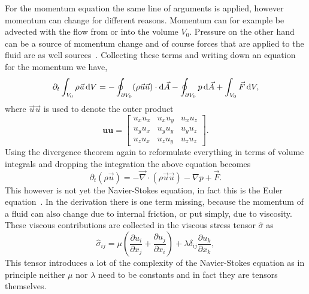 For the momentum equation the same line of arguments is applied, however momentum can change for different reasons.
Momentum can for example be advected with the flow from or into the volume $V_0$.
Pressure on the other hand can be a source of momentum change and of course forces that are applied to the fluid are as well sources~\cite{krugerLatticeBoltzmannMethod2017}.
Collecting these terms and writing down an equation for the momentum we have,
\begin{equation}\label{eq:navier_stokes_1}
    \partial_t \int_{V_0}\rho\vec{u}\mathop{}\!\mathrm{d} V = -\oint_{\partial V_0}(\rho\vec{u}\vec{u})\cdot\mathop{}\!\mathrm{d}\vec{A} - \oint_{\partial V_0} p\mathop{}\!\mathrm{d}\vec{A} + \int_{V_0} \vec{F}\mathop{}\!\mathrm{d} V, 
\end{equation}
where $\vec{u}\vec{u}$ is used to denote the outer product
\begin{equation}
    \mathbf{u}\mathbf{u} = \begin{bmatrix}
    u_x u_x & u_x u_y & u_x u_z \\
    u_y u_x & u_y u_y & u_y u_z \\
    u_z u_x & u_z u_y & u_z u_z
    \end{bmatrix} .
\end{equation}
Using the divergence theorem again to reformulate everything in terms of volume integrals and dropping the integration the above equation becomes
\begin{equation}\label{eq:navier_stokes_2}
    \partial_t(\rho\vec{u}) = -\vec{\nabla}\cdot(\rho\vec{u}\vec{u}) - \nabla p + \vec{F}.
\end{equation}
This however is not yet the Navier-Stokes equation, in fact this is the Euler equation~\cite{batchelorIntroductionFluidDynamics1967}.
In the derivation there is one term missing, because the momentum of a fluid can also change due to internal friction, or put simply, due to viscosity.
These viscous contributions are collected in the viscous stress tensor $\hat{\sigma}$ as
\begin{equation}\label{eq:stress_tens}
    \hat{\sigma}_{ij} = \mu\left(\frac{\partial u_i}{\partial x_j} + \frac{\partial u_j}{\partial x_i}\right) + \lambda\delta_{ij}\frac{\partial u_k}{\partial x_k},
\end{equation}
This tensor introduces a lot of the complexity of the Navier-Stokes equation as in principle neither $\mu$ nor $\lambda$ need to be constants and in fact they are tensors themselves.

